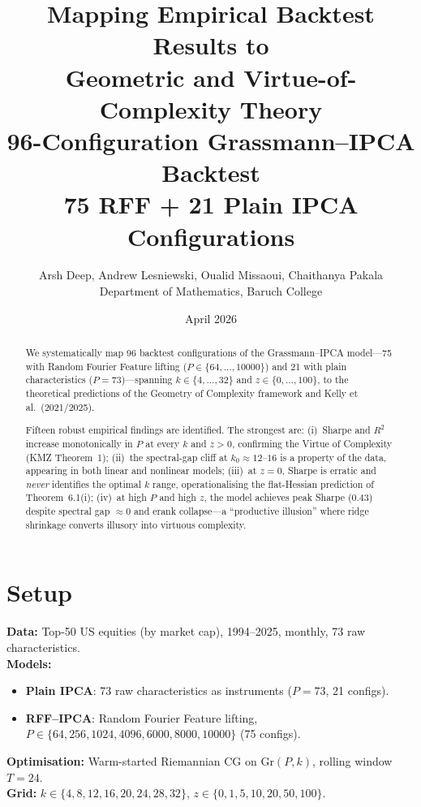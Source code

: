 \documentclass[11pt,a4paper]{article}
\title{%
  \textbf{Mapping Empirical Backtest Results to\\[3pt]
  Geometric and Virtue-of-Complexity Theory}\\[8pt]
  \large 96-Configuration Grassmann--IPCA Backtest\\[4pt]
  \normalsize 75 RFF + 21 Plain IPCA Configurations
}
\author{%
  Arsh Deep, Andrew Lesniewski, Oualid Missaoui, Chaithanya Pakala\\
  \small Department of Mathematics, Baruch College
}
\date{April 2026}
\begin{document}
\maketitle

\begin{abstract}
We systematically map 96 backtest configurations of the Grassmann--IPCA model---75 with Random Fourier Feature lifting ($P \in \{64, \ldots, 10000\}$) and 21 with plain characteristics ($P = 73$)---spanning $k \in \{4,\ldots,32\}$ and $z \in \{0,\ldots,100\}$, to the theoretical predictions of the Geometry of Complexity framework and Kelly et al.\ (2021/2025).

Fifteen robust empirical findings are identified.  The strongest are:
(i)~Sharpe and $R^2$ increase monotonically in $P$ at every $k$ and $z > 0$, confirming the Virtue of Complexity (KMZ Theorem~1);
(ii)~the spectral-gap cliff at $k_0 \approx 12$--$16$ is a property of the data, appearing in both linear and nonlinear models;
(iii)~at $z = 0$, Sharpe is erratic and \emph{never} identifies the optimal $k$ range, operationalising the flat-Hessian prediction of Theorem~6.1(i);
(iv)~at high $P$ and high $z$, the model achieves peak Sharpe ($0.43$) despite spectral gap $\approx 0$ and erank collapse---a ``productive illusion'' where ridge shrinkage converts illusory into virtuous complexity.
\end{abstract}

\tableofcontents
\newpage

\section{Setup}

\noindent\textbf{Data:} Top-50 US equities (by market cap), 1994--2025, monthly, 73 raw characteristics.\\
\textbf{Models:}
\begin{itemize}[nosep]
  \item \textbf{Plain IPCA}: 73 raw characteristics as instruments ($P = 73$, 21 configs).
  \item \textbf{RFF--IPCA}: Random Fourier Feature lifting, $P \in \{64, 256, 1024, 4096, 6000, 8000, 10000\}$ (75 configs).
\end{itemize}
\textbf{Optimisation:} Warm-started Riemannian CG on $\mathrm{Gr}(P, k)$, rolling window $T = 24$.\\
\textbf{Grid:} $k \in \{4, 8, 12, 16, 20, 24, 28, 32\}$, $z \in \{0, 1, 5, 10, 20, 50, 100\}$.
\end{document}

